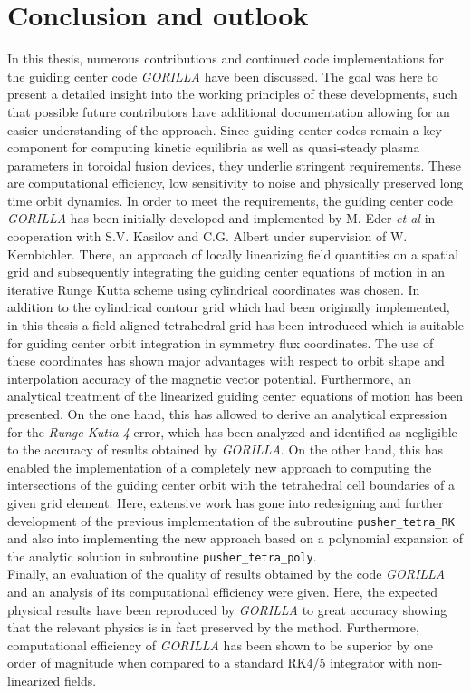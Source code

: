 \documentclass[./main.tex]{subfiles}
\begin{document}
\chapter{Conclusion and outlook}
In this thesis, numerous contributions and continued code implementations for the guiding center code \textit{GORILLA} have been discussed. The goal was here to present a detailed insight into the working principles of these developments, such that possible future contributors have additional documentation allowing for an easier understanding of the approach. Since guiding center codes remain a key component for computing kinetic equilibria as well as quasi-steady plasma parameters in toroidal fusion devices, they underlie stringent requirements. These are computational efficiency, low sensitivity to noise and physically preserved long time orbit dynamics. In order to meet the requirements, the guiding center code \textit{GORILLA} has been initially developed and implemented by M. Eder \textit{et al} \cite{Eder_DA} in cooperation with S.V. Kasilov and C.G. Albert under supervision of W. Kernbichler. There, an approach of locally linearizing field quantities on a spatial grid and subsequently integrating the guiding center equations of motion in an iterative Runge Kutta scheme using cylindrical coordinates was chosen. In addition to the cylindrical contour grid which had been originally implemented, in this thesis a field aligned tetrahedral grid has been introduced which is suitable for guiding center orbit integration in symmetry flux coordinates. The use of these coordinates has shown major advantages with respect to orbit shape and interpolation accuracy of the magnetic vector potential. 
Furthermore, an analytical treatment of the linearized guiding center equations of motion has been presented. On the one hand, this has allowed to derive an analytical expression for the \textit{Runge Kutta 4} error, which has been analyzed and identified as negligible to the accuracy of results obtained by \textit{GORILLA}. On the other hand, this has enabled the implementation of a completely new approach to computing the intersections of the guiding center orbit with the tetrahedral cell boundaries of a given grid element. Here, extensive work has gone into redesigning and further development of the previous implementation of the subroutine \texttt{pusher\_tetra\_RK} and also into implementing the new approach based on a polynomial expansion of the analytic solution in subroutine \texttt{pusher\_tetra\_poly}. \\
Finally, an evaluation of the quality of results obtained by the code \textit{GORILLA} and an analysis of its computational efficiency were given. Here, the expected physical results have been reproduced by \textit{GORILLA} to great accuracy showing that the relevant physics is in fact preserved by the method. Furthermore, computational efficiency of \textit{GORILLA} has been shown to be superior by one order of magnitude when compared to a standard RK4/5 integrator with non-linearized fields.
\end{document}
